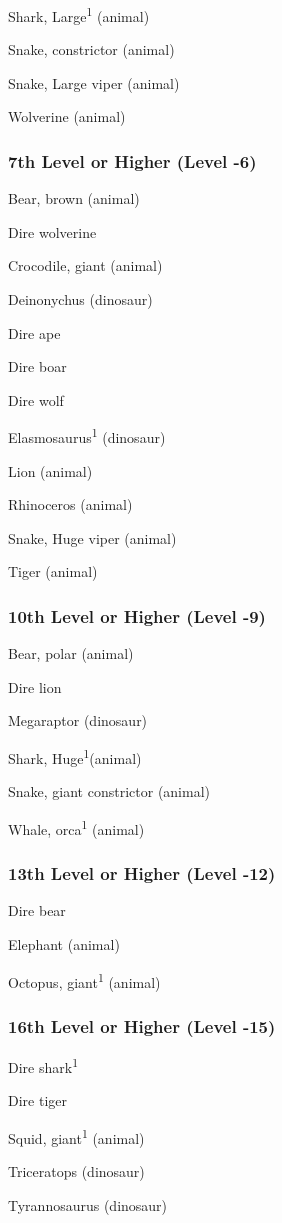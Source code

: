 Shark, Large\textsuperscript{1} (animal)

Snake, constrictor (animal)

Snake, Large viper (animal)

Wolverine (animal)

\subsubsection{7th Level or Higher (Level -6)}

Bear, brown (animal) 

Dire wolverine

Crocodile, giant (animal) 

Deinonychus (dinosaur) 

Dire ape 

Dire boar 

Dire wolf 

Elasmosaurus\textsuperscript{1} (dinosaur)

Lion (animal)

Rhinoceros (animal)

Snake, Huge viper (animal)

Tiger (animal)

\subsubsection{10th Level or Higher (Level -9)}

Bear, polar (animal) 

Dire lion 

Megaraptor (dinosaur) 

Shark, Huge\textsuperscript{1}(animal)

Snake, giant constrictor (animal)

Whale, orca\textsuperscript{1} (animal)

\subsubsection{13th Level or Higher (Level -12)}

Dire bear 

Elephant (animal)

Octopus, giant\textsuperscript{1} (animal)

\subsubsection{16th Level or Higher (Level -15)}

Dire shark\textsuperscript{1}

Dire tiger 

Squid, giant\textsuperscript{1} (animal)

Triceratops (dinosaur)

Tyrannosaurus (dinosaur)

